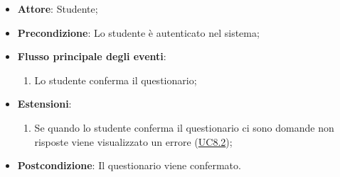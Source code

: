 \documentclass[12pt,a4paper]{article}
\begin{document}
\begin{itemize}

\item \textbf{Attore}: Studente; 
\item \textbf{Precondizione}: Lo studente è autenticato nel sistema;

\item \textbf{Flusso principale degli eventi}:
\begin{enumerate}
	\item Lo studente conferma il questionario;
	
\end{enumerate}
\item \textbf{Estensioni}:
\begin{enumerate}
	\item Se quando lo studente conferma il questionario ci sono domande non risposte viene visualizzato un errore (\hyperlink{UC8.2}{UC8.2});
	
\end{enumerate}
\item \textbf{Postcondizione}: Il questionario viene confermato.
\end{itemize}
\hypertarget{UC9}{}
\end{document}
